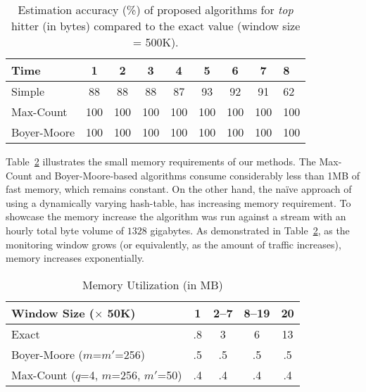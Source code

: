 \documentclass[10pt, conference, letterpaper,onecolumn]{IEEEtranv1.8}
\theoremstyle{plain}\newtheorem{thm}{Theorem}\newtheorem{lem}{Lemma}
\theoremstyle{definition}
\begin{document}
\begin{table}[t]
        \caption{\footnotesize Estimation accuracy (\%) of proposed algorithms
        for \emph{top} hitter  (in bytes) compared to the exact value (window size = 500K).}
        \label{tab:est:accuracy:value}
  \centering      
 \scriptsize       
\begin{tabular}{|l|cccccccl|}
\hline
{\bf Time} & {\bf 1}     & {\bf 2}     & {\bf 3}     & {\bf 4}     & {\bf 5}     & {\bf 6}     & {\bf 7}     & {\bf 8}       \\
\hline
\hline
Simple                        & 88  & 88  & 88  & 87  & 93  & 92  & 91  & 62 \\
Max-Count                     & 100 & 100 & 100 & 100 & 100 & 100 & 100 & 100  \\
Boyer-Moore                   & 100 & 100 & 100 & 100 & 100 & 100 & 100 & 100  \\
\hline
\end{tabular}
\end{table}



Table~\ref{tab:mem} illustrates the small memory requirements of our methods. The Max-Count and
Boyer-Moore-based algorithms consume considerably less than 1MB of fast memory, which remains constant. On the other hand, the na\"ive approach
of using a dynamically varying hash-table, has increasing memory requirement. 
To showcase the memory increase the algorithm was run against a stream with an hourly total byte volume of $1328$ gigabytes.
As demonstrated
in Table~\ref{tab:mem}, as the monitoring window grows (or equivalently, as the amount of traffic increases),
memory increases exponentially.



\begin{table}[t]
\caption{\footnotesize Memory Utilization (in MB)}
\label{tab:mem}
\centering
\begin{tabular}{|l| c c c c |}
\hline
{\bf Window Size ($\times$ 50K)}  & {\bf 1}    & {\bf 2--7}  & {\bf 8--19} & {\bf 20}     \\
\hline
\hline
Exact                                                 & .8 & 3  & 6  & 13  \\
Boyer-Moore ($m$=$m'$=256)                                                & .5 & .5 & .5 & .5   \\
Max-Count     ($q$=4, $m$=256, $m'$=50)                                       & .4 & .4 & .4 & .4  \\
\hline                                                      
\end{tabular}
\end{table}
\end{document}

